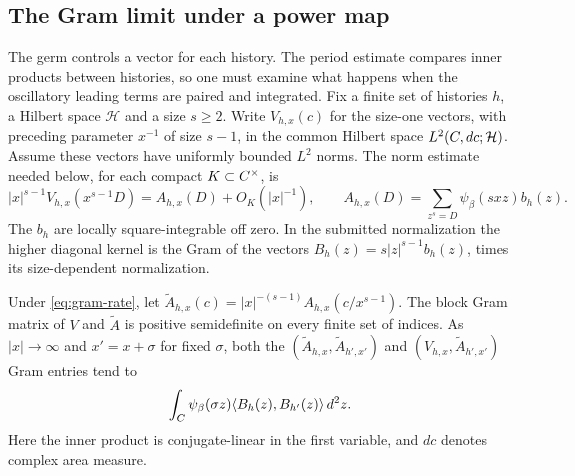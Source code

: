 \subsection{The Gram limit under a power map}

The germ controls a vector for each history. The period estimate compares inner products between histories, so one must examine what happens when the oscillatory leading terms are paired and integrated.
Fix a finite set of histories \(h\), a Hilbert space \(\mathcal H\)
and a size \(s\ge2\). Write \(V_{h,x}(c)\) for the
size-one vectors, with preceding parameter \(x^{-1}\) of
size \(s-1\), in the common Hilbert space \(L^2(C,dc;\mathcal H)\).
Assume these vectors have uniformly bounded \(L^2\) norms.
The norm estimate needed below, for each compact
\(K\subset C^\times\), is
\begin{equation}\label{eq:gram-rate}
 |x|^{s-1}V_{h,x}(x^{s-1}D)
 =A_{h,x}(D)+O_K(|x|^{-1}),\qquad
 A_{h,x}(D)=\sum_{z^s=D}\psi_\beta(sxz)b_h(z).
\end{equation}
The \(b_h\) are locally square-integrable off zero.
In the submitted normalization the higher diagonal kernel is
the Gram of the vectors \(B_h(z)=s|z|^{s-1}b_h(z)\),
times its size-dependent normalization.

\begin{construction}
\caption{The two inverse coordinates above a common determinant parameter. The branch \(\rho^s=(x/x')^{s-1}\) tending to one singles out \(\zeta=1\) in the limiting Gram integral.}\label{fig:power-map-branches}
\end{construction}

\begin{lemma}\label{lem:gram-limit}
Under \eqref{eq:gram-rate}, let
\(\widetilde A_{h,x}(c)=|x|^{-(s-1)}A_{h,x}(c/x^{s-1})\).
The block Gram matrix of \(V\) and \(\widetilde A\) is positive
semidefinite on every finite set of indices. As \(|x|\to\infty\)
and \(x'=x+\sigma\) for fixed \(\sigma\), both the
\((\widetilde A_{h,x},\widetilde A_{h',x'})\) and
\((V_{h,x},\widetilde A_{h',x'})\) Gram entries tend to
\[
 \int_{C}\psi_\beta(\sigma z)
             \langle B_h(z),B_{h'}(z)\rangle\,d^2z .
\]
Here the inner product is conjugate-linear in the first
variable, and \(dc\) denotes complex area measure.
\end{lemma}

